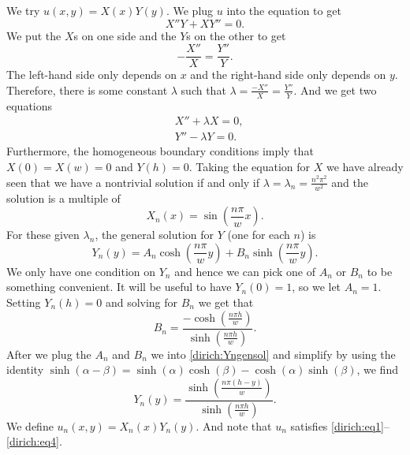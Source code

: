 We try $u(x,y) = X(x)Y(y)$.  We plug $u$ into the equation to get
\begin{equation*}
X''Y + XY'' = 0 .
\end{equation*}
We put the $X$s on one side and the $Y$s on the other to get
\begin{equation*}
- \frac{X''}{X} = \frac{Y''}{Y} .
\end{equation*}
The left-hand side only depends on $x$ and the right-hand side only depends
on $y$.  Therefore, there is some constant $\lambda$ such that
$\lambda = \frac{-X''}{X} = \frac{Y''}{Y}$.
And we get two equations
\begin{align*}
& X'' + \lambda X = 0 , \\
& Y'' - \lambda Y = 0 .
\end{align*}
Furthermore, the homogeneous boundary conditions imply that
$X(0) = X(w) = 0$ and $Y(h) = 0$.  Taking the equation for $X$
we have already seen that we have a nontrivial solution if and only if
$\lambda = \lambda_n = \frac{n^2 \pi^2}{w^2}$ and the solution is
a multiple of
\begin{equation*}
X_n(x) = \sin \left( \frac{n \pi}{w} x \right) .
\end{equation*}
For these given $\lambda_n$,
the general solution for $Y$ (one for each $n$) is
\begin{equation} \label{dirich:Yngensol}
Y_n(y) = A_n \cosh \left( \frac{n \pi}{w} y \right)
+ B_n \sinh \left( \frac{n \pi}{w} y \right) .
\end{equation}
We only have one condition on $Y_n$ and hence we can pick one of $A_n$
or $B_n$
to be something convenient.
It will be useful to have $Y_n(0) = 1$, so we let $A_n=1$.
Setting $Y_n(h) = 0$ and solving for $B_n$ we get that
\begin{equation*}
B_n = \frac{- \cosh \left( \frac{n \pi h }{w} \right)}%
{\sinh \left( \frac{n \pi h }{w} \right)} .
\end{equation*}
After we plug the $A_n$ and $B_n$ we
into \eqref{dirich:Yngensol} and simplify by using
the identity $\sinh(\alpha-\beta) =
\sinh(\alpha) \cosh(\beta) -
\cosh(\alpha) \sinh(\beta)$, we find
\begin{equation*}
Y_n(y) =
\frac{\sinh \left( \frac{n \pi (h-y) }{w} \right)}%
{\sinh \left( \frac{n \pi h }{w} \right)} .
\end{equation*}
We define $u_n(x,y) = X_n(x)Y_n(y)$.
And note that $u_n$
satisfies \eqref{dirich:eq1}--\eqref{dirich:eq4}.


